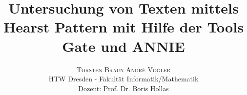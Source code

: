 \documentclass[twoside]{article}
\title{\vspace{-15mm}\fontsize{24pt}{10pt}\selectfont\textbf{Untersuchung von Texten mittels Hearst Pattern mit Hilfe der Tools Gate und ANNIE}}
\author{
\large
\textsc{Torsten Braun \qquad Andr\'{e} Vogler}\\[2mm]
\normalsize HTW Dresden - Fakultät Informatik/Mathematik \\
\normalsize Dozent: Prof. Dr. Boris Hollas
\vspace{-5mm}
}
\date{}
\begin{document}
  \maketitle
  \thispagestyle{fancy}

  

  \begin{multicols}{2}
    
    
  \end{multicols}
\end{document}
